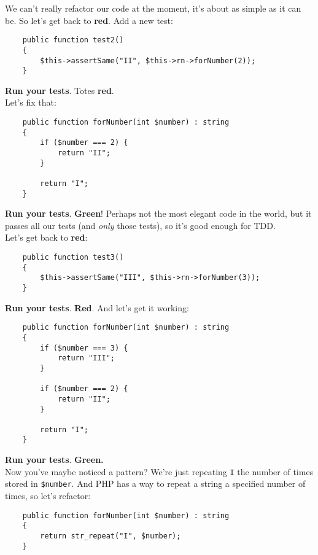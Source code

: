 We can't really refactor our code at the moment, it's about as simple as it can be. So let's get back to \textbf{red}. Add a new test:

\begin{verbatim}
    public function test2()
    {
        $this->assertSame("II", $this->rn->forNumber(2));
    }
\end{verbatim}

\textbf{Run your tests}. Totes \textbf{red}.
\\

Let's fix that:

\begin{verbatim}
    public function forNumber(int $number) : string
    {
        if ($number === 2) {
            return "II";
        }

        return "I";
    }
\end{verbatim}

\textbf{Run your tests}. \textbf{Green}! Perhaps not the most elegant code in the world, but it passes all our tests (and \textit{only} those tests), so it's good enough for TDD.
\\

Let's get back to \textbf{red}:

\begin{verbatim}
    public function test3()
    {
        $this->assertSame("III", $this->rn->forNumber(3));
    }
\end{verbatim}

\textbf{Run your tests}. \textbf{Red}. And let's get it working:

\begin{verbatim}
    public function forNumber(int $number) : string
    {
        if ($number === 3) {
            return "III";
        }

        if ($number === 2) {
            return "II";
        }

        return "I";
    }
\end{verbatim}

\textbf{Run your tests}. \textbf{Green.}
\\

Now you've maybe noticed a pattern? We're just repeating \texttt{I} the number of times stored in \texttt{\$number}. And PHP has a way to repeat a string a specified number of times, so let's refactor:

\begin{verbatim}
    public function forNumber(int $number) : string
    {
        return str_repeat("I", $number);
    }
\end{verbatim}

